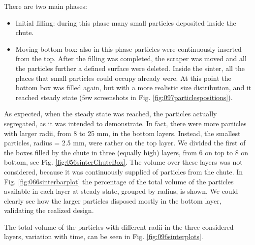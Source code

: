 
There are two main phases:
\begin{itemize}
  \item{Initial filling: during this phase many small particles deposited inside
  the chute.}
  \item{Moving bottom box: also in this phase particles were
continuously inserted from the top. After the filling was completed, the
scraper was moved and all the particles further a defined surface were
deleted. Inside the sinter, all the places that small particles could
occupy already were. At this point the bottom box was filled again, but
with a more realistic size distribution, and it reached steady state 
(few screenshots in Fig. \ref{fig:097particlespositions}).}
\end{itemize}
As expected, when the steady state was reached, the particles actually
segregated, as it was intended to demonstrate.
In fact, there were more particles with larger radii, from 8 to 25 mm, in the
bottom layers.
Instead, the smallest particles, radius = 2.5 mm, were rather on the top layer. 
We divided the first of the boxes
filled by the chute in three (equally high) layers, from 6 on top to 8 
on bottom, see Fig. \ref{fig:056sinterChuteBox}. 
The volume over these layers was not considered, because it was continuously 
supplied of particles from the chute. In Fig. \ref{fig:066sinterbarplot} the
percentage of the total volume of the particles available in each layer at steady-state, 
grouped by radius, is shown. 
We could clearly see how the larger particles disposed mostly 
in the bottom layer, validating the realized design.


The total volume of the particles with different radii in the three considered
layers, variation with time, can
be seen in Fig. \ref{fig:096sinterplots}.





